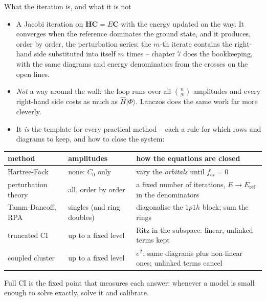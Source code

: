 \documentclass[aspectratio=169,10pt]{beamer}
\newcommand{\ket}[1]{\vert #1\rangle}
\begin{document}
\begin{frame}{What the iteration is, and what it is not}
  \footnotesize
  \begin{itemize}
    \item A Jacobi iteration on $\bm{H}\bm{C}=E\bm{C}$ with the energy updated on the way. It converges when the reference dominates the ground state, and it produces, order by order, the \alert{perturbation series}: the $m$-th iterate contains the right-hand side substituted into itself $m$ times -- chapter 7 does the bookkeeping, with the same diagrams and energy denominators from the crosses on the open lines.
    \item \emph{Not} a way around the wall: the loop runs over all $\binom{n}{N}$ amplitudes and every right-hand side costs as much as $\hat{H}\ket{\Phi}$. Lanczos does the same work far more cleverly.
    \item It \emph{is} the template for every practical method -- each a rule for which rows and diagrams to keep, and how to close the system:
  \end{itemize}
  \vspace{-0.4em}
  \begin{center}\scriptsize
  \renewcommand{\arraystretch}{1.1}
  \begin{tabular}{lll}
    \toprule
    method & amplitudes & how the equations are closed\\
    \midrule
    Hartree-Fock & none: $C_0$ only & vary the \emph{orbitals} until $f_{ai}=0$\\
    perturbation theory & all, order by order & a fixed number of iterations, $E\to E_{\mathrm{ref}}$ in the denominators\\
    Tamm-Dancoff, RPA & singles (and ring doubles) & diagonalise the $1p1h$ block; sum the rings\\
    truncated CI & up to a fixed level & Ritz in the subspace: linear, unlinked terms kept\\
    coupled cluster & up to a fixed level & $e^{\hat{T}}$: same diagrams plus non-linear ones; unlinked terms cancel\\
    \bottomrule
  \end{tabular}
  \end{center}
  \vspace{-0.2em}Full CI is the fixed point that measures each answer: whenever a model is small enough to solve exactly, solve it and calibrate.
\end{frame}
\end{document}
